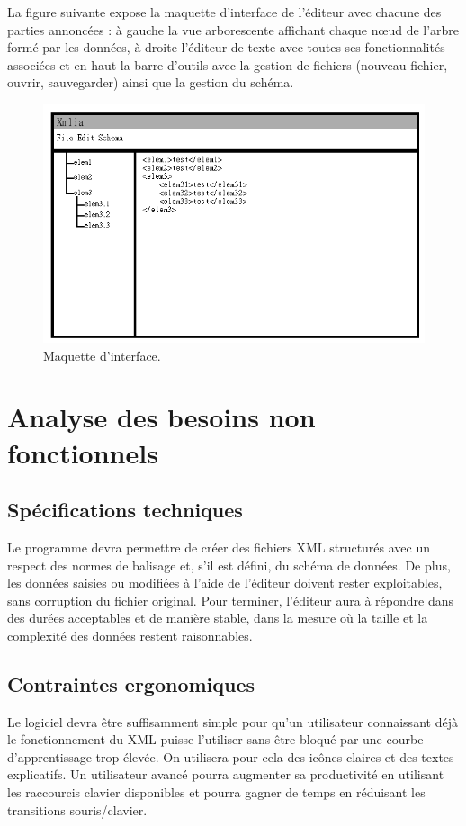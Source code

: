 	La figure suivante expose la maquette d'interface de l'éditeur avec chacune des parties annoncées : à gauche la vue arborescente affichant chaque nœud de l'arbre formé par les données, à droite l'éditeur de texte avec toutes ses fonctionnalités associées et en haut la barre d'outils avec la gestion de fichiers (nouveau fichier, ouvrir, sauvegarder) ainsi que la gestion du schéma.

\begin{figure}[ht!]
      \centering
      \includegraphics[scale=0.5]{images/analyse-maquette.png}
      \caption[Maquette d'interface]{Maquette d'interface.}
\end{figure}
	
	\section{Analyse des besoins non fonctionnels}
		\subsection{Spécifications techniques}
		Le programme devra permettre de créer des fichiers XML structurés avec un respect des normes de balisage et, s'il est défini, du schéma de données. De plus, les données saisies ou modifiées à l'aide de l'éditeur doivent rester exploitables, sans corruption du fichier original. Pour terminer, l'éditeur aura à répondre dans des durées acceptables et de manière stable, dans la mesure où la taille et la complexité des données restent raisonnables.
		
		\subsection{Contraintes ergonomiques}
                Le logiciel devra être suffisamment simple pour qu'un utilisateur connaissant déjà le fonctionnement du XML puisse l'utiliser sans être bloqué par une courbe d'apprentissage trop élevée. On utilisera pour cela des icônes claires et des textes explicatifs.
                Un utilisateur avancé pourra augmenter sa productivité en utilisant les raccourcis clavier disponibles et pourra gagner de temps en réduisant les transitions souris/clavier.
